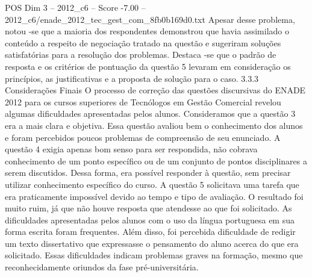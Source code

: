 \begin{textsample}{POS Dim 3 – 2012\_c6 – Score -7.00 – 2012\_c6/enade\_2012\_tec\_gest\_com\_8fb0b169d0.txt}
Apesar desse problema, notou -se que a maioria dos respondentes demonstrou que havia assimilado o conteúdo a respeito de negociação tratado na questão e sugeriram soluções satisfatórias para a resolução dos problemas.
Destaca -se que o padrão de resposta e os critérios de pontuação da questão 5 levaram em consideração os princípios, as justificativas e a proposta de solução para o caso. 3.3.3 Considerações Finais O processo de correção das questões discursivas do ENADE 2012 para os cursos superiores de Tecnólogos em Gestão Comercial revelou algumas dificuldades apresentadas pelos alunos.
Consideramos que a questão 3 era a mais clara e objetiva.
Essa questão avaliou bem o conhecimento dos alunos e foram percebidos poucos problemas de compreensão de seu enunciado.
A questão 4 exigia apenas bom senso para ser respondida, não cobrava conhecimento de um ponto específico ou de um conjunto de pontos disciplinares a serem discutidos.
Dessa forma, era possível responder à questão, sem precisar utilizar conhecimento específico do curso.
A questão 5 solicitava uma tarefa que era praticamente impossível devido ao tempo e tipo de avaliação.
O resultado foi muito ruim, já que não houve resposta que atendesse ao que foi solicitado.
As dificuldades apresentadas pelos alunos com o uso da língua portuguesa em sua forma escrita foram frequentes.
Além disso, foi percebida dificuldade de redigir um texto dissertativo que expressasse o pensamento do aluno acerca do que era solicitado.
Essas dificuldades indicam problemas graves na formação, mesmo que reconhecidamente oriundos da fase pré-universitária.

\end{textsample}
